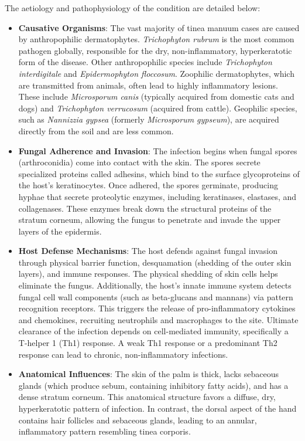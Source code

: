 The aetiology and pathophysiology of the condition are detailed below:
\begin{itemize}
    \item \textbf{Causative Organisms}: The vast majority of tinea manuum cases are caused by anthropophilic dermatophytes. \textit{Trichophyton rubrum} is the most common pathogen globally, responsible for the dry, non-inflammatory, hyperkeratotic form of the disease. Other anthropophilic species include \textit{Trichophyton interdigitale} and \textit{Epidermophyton floccosum}. Zoophilic dermatophytes, which are transmitted from animals, often lead to highly inflammatory lesions. These include \textit{Microsporum canis} (typically acquired from domestic cats and dogs) and \textit{Trichophyton verrucosum} (acquired from cattle). Geophilic species, such as \textit{Nannizzia gypsea} (formerly \textit{Microsporum gypseum}), are acquired directly from the soil and are less common.
    \item \textbf{Fungal Adherence and Invasion}: The infection begins when fungal spores (arthroconidia) come into contact with the skin. The spores secrete specialized proteins called adhesins, which bind to the surface glycoproteins of the host's keratinocytes. Once adhered, the spores germinate, producing hyphae that secrete proteolytic enzymes, including keratinases, elastases, and collagenases. These enzymes break down the structural proteins of the stratum corneum, allowing the fungus to penetrate and invade the upper layers of the epidermis.
    \item \textbf{Host Defense Mechanisms}: The host defends against fungal invasion through physical barrier function, desquamation (shedding of the outer skin layers), and immune responses. The physical shedding of skin cells helps eliminate the fungus. Additionally, the host's innate immune system detects fungal cell wall components (such as beta-glucans and mannans) via pattern recognition receptors. This triggers the release of pro-inflammatory cytokines and chemokines, recruiting neutrophils and macrophages to the site. Ultimate clearance of the infection depends on cell-mediated immunity, specifically a T-helper 1 (Th1) response. A weak Th1 response or a predominant Th2 response can lead to chronic, non-inflammatory infections.
    \item \textbf{Anatomical Influences}: The skin of the palm is thick, lacks sebaceous glands (which produce sebum, containing inhibitory fatty acids), and has a dense stratum corneum. This anatomical structure favors a diffuse, dry, hyperkeratotic pattern of infection. In contrast, the dorsal aspect of the hand contains hair follicles and sebaceous glands, leading to an annular, inflammatory pattern resembling tinea corporis.

\end{itemize}
